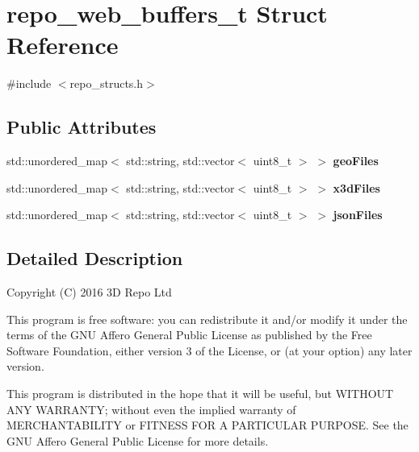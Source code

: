 \hypertarget{structrepo__web__buffers__t}{}\section{repo\+\_\+web\+\_\+buffers\+\_\+t Struct Reference}
\label{structrepo__web__buffers__t}


{\ttfamily \#include $<$repo\+\_\+structs.\+h$>$}

\subsection*{Public Attributes}
\begin{DoxyCompactItemize}
\item 
\hypertarget{structrepo__web__buffers__t_a906b00c40edb2a3970b287508d2ac595}{}std\+::unordered\+\_\+map$<$ std\+::string, std\+::vector$<$ uint8\+\_\+t $>$ $>$ {\bfseries geo\+Files}\label{structrepo__web__buffers__t_a906b00c40edb2a3970b287508d2ac595}

\item 
\hypertarget{structrepo__web__buffers__t_af22fbdf81f61f19f59edf60c39aaca02}{}std\+::unordered\+\_\+map$<$ std\+::string, std\+::vector$<$ uint8\+\_\+t $>$ $>$ {\bfseries x3d\+Files}\label{structrepo__web__buffers__t_af22fbdf81f61f19f59edf60c39aaca02}

\item 
\hypertarget{structrepo__web__buffers__t_abefcc3f739928fa1ce1eadd88f6e7e01}{}std\+::unordered\+\_\+map$<$ std\+::string, std\+::vector$<$ uint8\+\_\+t $>$ $>$ {\bfseries json\+Files}\label{structrepo__web__buffers__t_abefcc3f739928fa1ce1eadd88f6e7e01}

\end{DoxyCompactItemize}


\subsection{Detailed Description}
Copyright (C) 2016 3\+D Repo Ltd

This program is free software\+: you can redistribute it and/or modify it under the terms of the G\+N\+U Affero General Public License as published by the Free Software Foundation, either version 3 of the License, or (at your option) any later version.

This program is distributed in the hope that it will be useful, but W\+I\+T\+H\+O\+U\+T A\+N\+Y W\+A\+R\+R\+A\+N\+T\+Y; without even the implied warranty of M\+E\+R\+C\+H\+A\+N\+T\+A\+B\+I\+L\+I\+T\+Y or F\+I\+T\+N\+E\+S\+S F\+O\+R A P\+A\+R\+T\+I\+C\+U\+L\+A\+R P\+U\+R\+P\+O\+S\+E. See the G\+N\+U Affero General Public License for more details.

